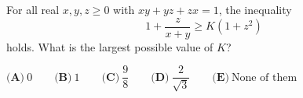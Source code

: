 For all real $x,y,z\ge0$ with $xy+yz+zx=1$, the inequality
\[
1+\dfrac{z}{x+y}\ge K\left(1+z^2\right)
\]
holds. What is the largest possible value of $K$?

$\textbf{(A)}\ 0\qquad\textbf{(B)}\ 1\qquad\textbf{(C)}\ \dfrac{9}{8}\qquad\textbf{(D)}\ \dfrac{2}{\sqrt3}\qquad\textbf{(E)}\ \text{None of them}$
